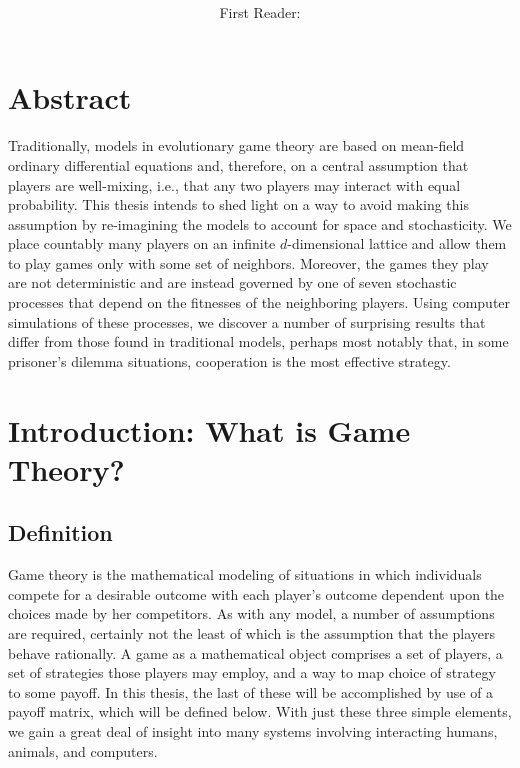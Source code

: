 \documentclass[notitlepage,reqno]{amsart}
\title{\huge{\textmd{\textbf{\hmwkTitle}}}}
\date{}
\author{\textbf{\hmwkAuthor} \\
\textmd{First Reader: \hmwkInstructor}}
\newenvironment{changemargin}[2]{
\begin{list}{}{
\setlength{\topsep}{0pt}
\setlength{\leftmargin}{#1}
\setlength{\rightmargin}{#2}
\setlength{\parindent}{0 pt}
\setlength{\listparindent}{\parindent}
\setlength{\itemindent}{\parindent}
\setlength{\parsep}{\parskip}
}
\item[]}{\end{list}}
\begin{document}
\maketitle
\thispagestyle{fancy}

\begin{changemargin}{.3in}{.3in}
\section*{Abstract}
Traditionally, models in evolutionary game theory are based on mean-field
ordinary differential equations and, therefore, on a central
assumption that players are well-mixing, i.e., that any two players may interact with equal probability. This thesis intends to shed light
on a way to avoid making this assumption by re-imagining the models to
account for space and stochasticity. We place countably many players
on an infinite $d$-dimensional lattice and allow them to play games
only with some set of neighbors. Moreover, the games they
play are not deterministic and are instead governed by one of seven
stochastic processes that depend on the fitnesses of the neighboring
players. Using computer simulations of these processes, we discover a number of surprising results that differ from those found in traditional models, perhaps most notably that, in some prisoner's dilemma situations, cooperation is the most effective strategy.
\end{changemargin}

\section{Introduction: What is Game Theory?}
\subsection{Definition}
Game theory is the mathematical modeling of situations in which
individuals compete for a desirable outcome with each player's
outcome dependent upon the choices made by her competitors. As with
any model, a number of assumptions are required, certainly not the
least of which is the assumption that the players behave rationally. A
game as a mathematical object comprises a set of players, a set of
strategies those players may employ, and a way to map choice of
strategy to some payoff. In this thesis, the last of these will be accomplished by use of a payoff matrix, which will be defined below. With just these three simple elements, we gain a great deal of insight into many systems involving interacting humans, animals, and computers.
\end{document}
